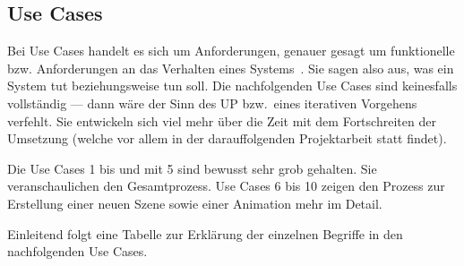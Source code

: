 
\subsection{Use Cases}
\label{subsec:requirements:use-cases}

Bei Use Cases handelt es sich um Anforderungen, genauer gesagt um funktionelle
bzw. Anforderungen an das Verhalten eines Systems~\cite[S. 61 bis 63]{larman_applying_2004}.
Sie sagen also aus, was ein System tut beziehungsweise tun soll. Die nachfolgenden Use
Cases sind keinesfalls vollständig --- dann wäre der Sinn des UP bzw.\ eines
iterativen Vorgehens verfehlt. Sie entwickeln sich viel mehr über die Zeit mit
dem Fortschreiten der Umsetzung (welche vor allem in der darauffolgenden
Projektarbeit statt findet).

Die Use Cases 1 bis und mit 5 sind bewusst sehr grob gehalten. Sie
veranschaulichen den Gesamtprozess. Use Cases 6 bis 10 zeigen den Prozess zur
Erstellung einer neuen Szene sowie einer Animation mehr im Detail.

Einleitend folgt eine Tabelle zur Erklärung der einzelnen Begriffe in den
nachfolgenden Use Cases.












